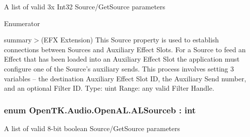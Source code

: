 A list of valid 3x Int32 Source/\-Get\-Source parameters

\begin{Desc}
\item[Enumerator]\par
\begin{description}
\item[{\em 
\hypertarget{namespace_open_t_k_1_1_audio_1_1_open_a_l_a5038b3efb0e0b18183b96cc12b925987a68ed9e08d43ded7b802e062997389b2b}{Efx\-Auxiliary\-Send\-Filter}\label{namespace_open_t_k_1_1_audio_1_1_open_a_l_a5038b3efb0e0b18183b96cc12b925987a68ed9e08d43ded7b802e062997389b2b}
}]summary$>$(E\-F\-X Extension) This Source property is used to establish connections between Sources and Auxiliary Effect Slots. For a Source to feed an Effect that has been loaded into an Auxiliary Effect Slot the application must configure one of the Source’s auxiliary sends. This process involves setting 3 variables – the destination Auxiliary Effect Slot I\-D, the Auxiliary Send number, and an optional Filter I\-D. Type\-: uint Range\-: any valid Filter Handle.\end{description}
\end{Desc}
\hypertarget{namespace_open_t_k_1_1_audio_1_1_open_a_l_ab6ee1a1f6b513b5681a01359b8aaf3c3}{
\subsubsection[{A\-L\-Sourceb}]{\setlength{\rightskip}{0pt plus 5cm}enum {\bf Open\-T\-K.\-Audio.\-Open\-A\-L.\-A\-L\-Sourceb} \-: int}}\label{namespace_open_t_k_1_1_audio_1_1_open_a_l_ab6ee1a1f6b513b5681a01359b8aaf3c3}


A list of valid 8-\/bit boolean Source/\-Get\-Source parameters

